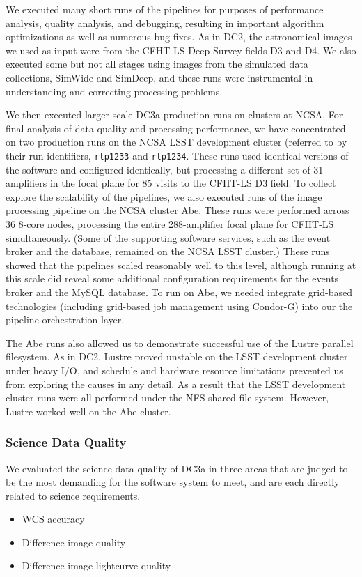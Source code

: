 We executed many short runs of the pipelines for purposes of
performance analysis, quality analysis, and debugging, resulting in
important algorithm optimizations as well as numerous bug fixes. As in
DC2, the astronomical images we used as input were from the CFHT-LS
Deep Survey fields D3 and D4.  We also executed some but not all
stages using images from the simulated data collections, SimWide and
SimDeep, and these runs were instrumental in understanding and
correcting processing problems.

We then executed larger-scale DC3a production runs on clusters at
NCSA.  For final analysis of data quality and processing performance,
we have concentrated on two production runs on the NCSA LSST
development cluster (referred to by their run
identifiers, \texttt{rlp1233} and \texttt{rlp1234}. These runs used
identical versions of the software and configured identically, but
processing a different set of 31 amplifiers in the focal plane for 85
visits to the CFHT-LS D3 field.  To collect explore the scalability of
the pipelines, we also executed runs of the image processing pipeline
on the NCSA cluster Abe.  These runs were performed across 36 8-core
nodes, processing the entire 288-amplifier focal plane for CFHT-LS
simultaneously.  (Some of the supporting software services, such as
the event broker and the database, remained on the NCSA LSST cluster.)
These runs showed that the pipelines scaled reasonably well to this
level, although running at this scale did reveal some additional
configuration requirements for the events broker and the MySQL
database.  To run on Abe, we needed integrate grid-based technologies
(including grid-based job management using Condor-G) into our the
pipeline orchestration layer.

The Abe runs also allowed us to demonstrate successful use of the 
Lustre parallel filesystem.  As in DC2, Lustre proved unstable  on the
LSST development cluster under heavy I/O, and schedule and hardware
resource limitations prevented us from exploring the causes in 
any detail.  As a result that the LSST development cluster runs were
all performed under the NFS shared file system.  However, Lustre
worked well on the Abe cluster. 

\subsubsection*{Science Data Quality}
We evaluated the science data quality of DC3a in three areas that are
judged to be the most demanding for the software system to meet, 
and are each directly related to science requirements. 
\begin{itemize}
\item WCS accuracy
\item Difference image quality
\item Difference image lightcurve quality
\end{itemize}
